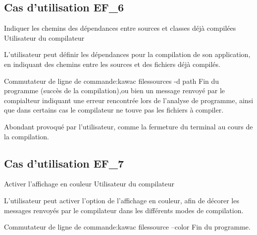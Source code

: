 \subsection{Cas d'utilisation EF\_6}
\fiche
{Indiquer les chemins des dépendances entre sources et classes déjà compilées}          %
{Utilisateur du compilateur}                               %
{                                                %
   
L'utilisateur peut définir les dépendances pour la compilation de son application, en indiquant des chemins entre les sources et des fichiers déjà compilés.}
{
  
}                                                %
{Commutateur de ligne de commande:kawac filessources -d path}                             %
{Fin du programme (succès de la compilation),ou bien un message renvoyé par le compialteur indiquant une erreur rencontrée lors de l'analyse de programme, ainsi que dans certains cas le compilateur ne touve pas les fichiers à compiler.}                       %
{                                                %
 
}{} %
{Abondant provoqué par l'utilisateur, comme la fermeture du terminal au cours de la compilation.} %

\subsection{Cas d'utilisation EF\_7}
\fiche
{Activer l'affichage en couleur}          %
{Utilisateur du compilateur}                               %
{                                                %
   
  L'utilisateur peut activer l'option de l'affichage en couleur, afin de décorer les messages renvoyés par le compilateur dans les différents modes de compilation.   
}
{
  
}                                                %
{Commutateur de ligne de commande:kawac filessource --color}                             %
{Fin du programme.}                       %
{                                                %
 
}{} %
{} %
